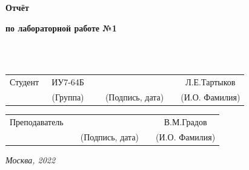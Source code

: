 \begin{center}
	\vspace{2cm}
	{\bf\huge Отчёт\par}
	{\bf\Large по лабораторной работе №1\par}
	\vspace{0.5cm}
\end{center}


\noindent
{}
\\

\noindent
{}
\\

\vspace{1.5cm}
\noindent
\begin{tabular}{l c c c c c}
	Студент      & ~ИУ7-64Б~               & \hspace{2.5cm} & \hspace{3cm}                 & &  Л.Е.Тартыков \\\cline{2-2}\cline{4-4} \cline{6-6}
	\hspace{3cm} & {\footnotesize(Группа)} &                & {\footnotesize(Подпись, дата)} & & {\footnotesize(И.О. Фамилия)}
\end{tabular}

\noindent
\begin{tabular}{l c c c c}
	Преподаватель & \hspace{5cm}   & \hspace{3cm}                 & & В.М.Градов \\\cline{3-3} \cline{5-5} 
	\hspace{3cm}  &                & {\footnotesize(Подпись, дата)} & & {\footnotesize(И.О. Фамилия)}
\end{tabular}

\begin{center}	
	\vfill
	\large \textit {Москва, 2022}
\end{center}

\thispagestyle {empty}
\pagebreak